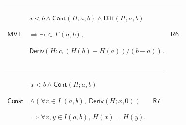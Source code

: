 \documentclass[11pt]{amsart}
\newlength{\FTCThreeColumnBody}
\begin{document}
{\begin{tabular}{|@{}>{\centering\arraybackslash}m{0.251968\FTCThreeColumnBody}|>{\centering\arraybackslash}m{0.590551\FTCThreeColumnBody}|>{\centering\arraybackslash}m{0.157480\FTCThreeColumnBody}|}
\hypertarget{lem:MVT}{$\displaystyle \textsf{MVT}$} & $\displaystyle a<b\land\textsf{Cont}(H;a,b)\land\textsf{Diff}(H;a,b)$\par
$\displaystyle \Rightarrow\exists c\in I^\circ(a,b),$\par
$\displaystyle \textsf{Deriv}(H;c,(H(b)-H(a))/(b-a)).$ & \hyperlink{proof:R6}{$\displaystyle \textsf{R6}$}\\ \hline
\end{tabular}%
\par\setlength{\parskip}{0pt}\nointerlineskip
\noindent
\begin{tabular}{|@{}>{\centering\arraybackslash}m{0.251968\FTCThreeColumnBody}|>{\centering\arraybackslash}m{0.590551\FTCThreeColumnBody}|>{\centering\arraybackslash}m{0.157480\FTCThreeColumnBody}|}\hline
\hypertarget{lem:Const}{$\displaystyle \textsf{Const}$} & $\displaystyle a<b\land\textsf{Cont}(H;a,b)$\par
$\displaystyle \land(\forall x\in I^\circ(a,b),\ \textsf{Deriv}(H;x,0))$\par
$\displaystyle \Rightarrow\forall x,y\in I(a,b),\ H(x)=H(y).$ & \hyperlink{proof:R7}{$\displaystyle \textsf{R7}$}\\ \hline
\end{tabular}%
\par
}
\end{document}

